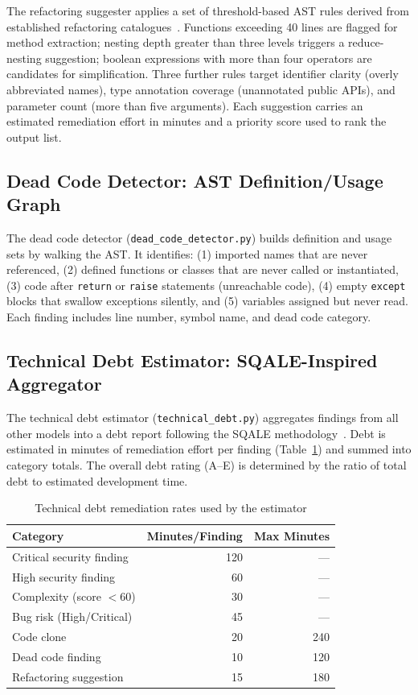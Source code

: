 \documentclass[12pt, oneside]{report}
\begin{document}
The refactoring suggester applies a set of threshold-based AST rules derived from
established refactoring catalogues~\cite{fowler1999}. Functions exceeding 40 lines
are flagged for method extraction; nesting depth greater than three levels triggers
a reduce-nesting suggestion; boolean expressions with more than four operators are
candidates for simplification. Three further rules target identifier clarity (overly
abbreviated names), type annotation coverage (unannotated public APIs), and
parameter count (more than five arguments). Each suggestion carries an estimated
remediation effort in minutes and a priority score used to rank the output list.

\subsection{Dead Code Detector: AST Definition/Usage Graph}
\label{ssec:deadcode}

The dead code detector (\texttt{dead\_code\_detector.py}) builds definition and usage
sets by walking the AST. It identifies: (1) imported names that are never referenced,
(2) defined functions or classes that are never called or instantiated, (3) code after
\texttt{return} or \texttt{raise} statements (unreachable code), (4) empty \texttt{except}
blocks that swallow exceptions silently, and (5) variables assigned but never read.
Each finding includes line number, symbol name, and dead code category.

\subsection{Technical Debt Estimator: SQALE-Inspired Aggregator}
\label{ssec:debt}

The technical debt estimator (\texttt{technical\_debt.py}) aggregates findings from all
other models into a debt report following the SQALE methodology~\cite{letouzey2012}.
Debt is estimated in minutes of remediation effort per finding (Table~\ref{tab:debtrates})
and summed into category totals. The overall debt rating (A--E) is determined by the
ratio of total debt to estimated development time.

\begin{table}[H]
\centering
\caption{Technical debt remediation rates used by the estimator}
\label{tab:debtrates}
\begin{tabular}{@{}lrr@{}}
\toprule
\textbf{Category} & \textbf{Minutes/Finding} & \textbf{Max Minutes} \\
\midrule
Critical security finding & 120 & --- \\
High security finding     &  60 & --- \\
Complexity (score $< 60$) &  30 & --- \\
Bug risk (High/Critical)  &  45 & --- \\
Code clone                &  20 & 240 \\
Dead code finding         &  10 & 120 \\
Refactoring suggestion    &  15 & 180 \\
\bottomrule
\end{tabular}
\end{table}
\end{document}
